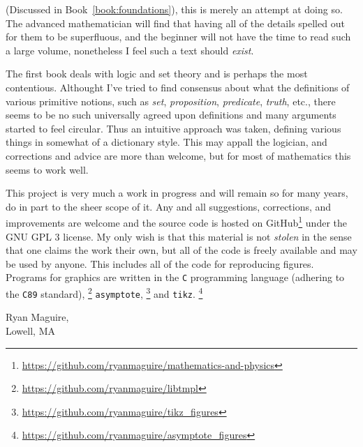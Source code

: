 (Discussed in Book~\ref{book:foundations}), this is merely an attempt at doing
so. The advanced mathematician will find that having all of the details spelled
out for them to be superfluous, and the beginner will not have the time to read
such a large volume, nonetheless I feel such a text should \textit{exist}.
\par\hfill\par
The first book deals with logic and set theory and is perhaps the most
contentious. Althought I've tried to find consensus about what the definitions
of various primitive notions, such as \textit{set}, \textit{proposition},
\textit{predicate}, \textit{truth}, etc., there seems to be no such universally
agreed upon definitions and many arguments started to feel circular. Thus an
intuitive approach was taken, defining various things in somewhat of a
dictionary style. This may appall the logician, and corrections and advice are
more than welcome, but for most of mathematics this seems to work well.
\par\hfill\par
This project is very much a work in progress and will remain so for many years,
do in part to the sheer scope of it. Any and all suggestions,
corrections, and improvements are welcome and the source code is hosted on
GitHub\footnote{\url{https://github.com/ryanmaguire/mathematics-and-physics}}
under the GNU GPL 3 license. My only wish is that this material is not
\textit{stolen} in the sense that one claims the work their own, but all of the
code is freely available and may be used by anyone. This includes all of the
code for reproducing figures. Programs for graphics are written in the
\texttt{C} programming language (adhering to the \texttt{C89} standard),%
\footnote{%
    \url{https://github.com/ryanmaguire/libtmpl}%
}
\texttt{asymptote},%
\footnote{%
    \url{https://github.com/ryanmaguire/tikz_figures}%
}
and \texttt{tikz}.%
\footnote{%
    \url{https://github.com/ryanmaguire/asymptote_figures}%
}
\begin{flushright}
    Ryan Maguire,\\
    Lowell, MA\\
\end{flushright}
